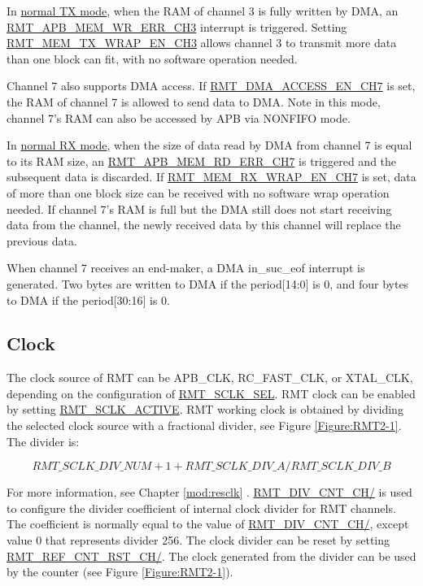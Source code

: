 \documentclass[main\_\_EN.tex]{subfiles}
\begin{document}
In \hyperref[sec:normal-tx-mode]{normal TX mode}, when the RAM of channel 3 is fully written by DMA, an \hyperref[fielddesc:RMTAPBMEMWRERRCHN]{RMT\_APB\_MEM\_WR\_ERR\_CH3} interrupt is triggered. Setting \hyperref[fielddesc:RMTMEMTXWRAPENCHN]{RMT\_MEM\_TX\_WRAP\_EN\_CH3} allows channel 3 to transmit more data than one block can fit, with no software operation needed.

Channel 7 also supports DMA access. If \hyperref[fielddesc:RMTDMAACCESSENCH7]{RMT\_DMA\_ACCESS\_EN\_CH7} is set, the RAM of channel 7 is allowed to send data to DMA. Note in this mode, channel 7's RAM can also be accessed by APB via NONFIFO mode.

In \hyperref[sec:normal-rx-mode]{normal RX mode}, when the size of data read by DMA from channel 7 is equal to its RAM size, an \hyperref[fielddesc:RMTAPBMEMRDERRCHM]{RMT\_APB\_MEM\_RD\_ERR\_CH7} is triggered and the subsequent data is discarded. If \hyperref[fielddesc:RMTMEMRXWRAPENCHM]{RMT\_MEM\_RX\_WRAP\_EN\_CH7} is set, data of more than one block size can be received with no software wrap operation needed. If channel 7's RAM is full but the DMA still does not start receiving data from the channel, the newly received data by this channel will replace the previous data.

\begin{tiplisting}
When channel 7 receives an end-maker, a DMA in\_suc\_eof interrupt is generated. Two bytes are written to DMA if the period[14:0] is 0, and four bytes to DMA if the period[30:16] is 0.
\end{tiplisting}

\subsection{Clock}\label{clock}
The clock source of RMT can be APB\_CLK, RC\_FAST\_CLK, or XTAL\_CLK, depending on the configuration of \hyperref[fielddesc:RMTSCLKSEL]{RMT\_SCLK\_SEL}. RMT clock can be enabled by setting \hyperref[fielddesc:RMTSCLKACTIVE]{RMT\_SCLK\_ACTIVE}. RMT working clock is obtained by dividing the selected clock source with a fractional divider, see Figure \ref{Figure:RMT2-1}. The divider is:

$$
\hyperref[fielddesc:RMTSCLKDIVNUM]{RMT\_SCLK\_DIV\_NUM} + 1 + \hyperref[fielddesc:RMTSCLKDIVA]{RMT\_SCLK\_DIV\_A}/\hyperref[fielddesc:RMTSCLKDIVB]{RMT\_SCLK\_DIV\_B}
$$

For more information, see Chapter \ref{mod:resclk} \textit{}. \hyperref[fielddesc:RMTDIVCNTCHN]{RMT\_DIV\_CNT\_CH/} is used to configure the divider coefficient of internal clock divider for RMT channels. The coefficient is normally equal to the value of \hyperref[fielddesc:RMTDIVCNTCHN]{RMT\_DIV\_CNT\_CH/}, except value 0 that represents divider 256. The clock divider can be reset by setting \hyperref[fielddesc:RMTREFCNTRSTCHN]{RMT\_REF\_CNT\_RST\_CH/}. The clock generated from the divider can be used by the counter (see Figure \ref{Figure:RMT2-1}).
\end{document}
